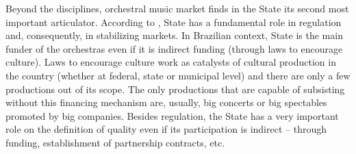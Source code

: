 \documentclass[a4paper, 12pt, openright, oneside, german, french, brazil, english]{abntex2}
\begin{document}
	
	Beyond the disciplines, orchestral music market finds in the State its second most important articulator. According to , State has a fundamental role in regulation and, consequently, in stabilizing markets. In Brazilian context, State is the main funder of the orchestras even if it is indirect funding (through laws to encourage culture). Laws to encourage culture work as catalysts of cultural production in the country (whether at federal, state or municipal level) and there are only a few productions out of its scope. The only productions that are capable of subsisting without this financing mechanism are, usually, big concerts or big spectables promoted by big companies. Besides regulation, the State has a very important role on the definition of quality even if its participation is indirect -- through funding, establishment of partnership contracts, etc.
	
	
\end{document}
